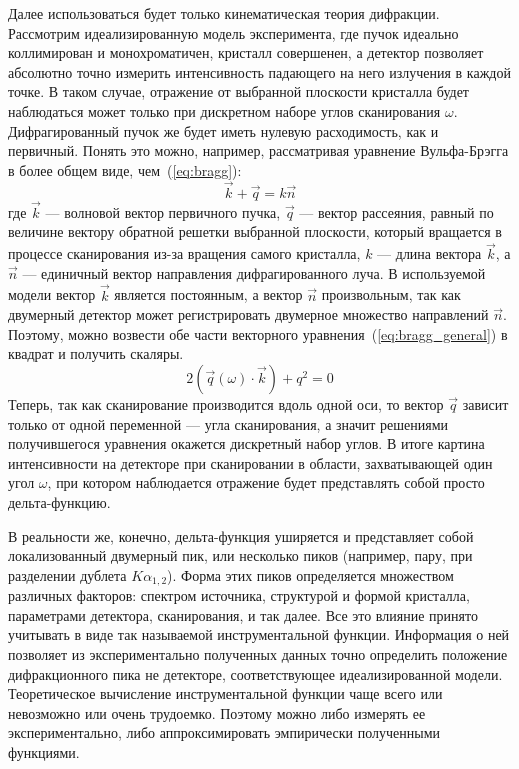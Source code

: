 Далее использоваться будет только кинематическая теория дифракции.
Рассмотрим идеализированную модель эксперимента, где пучок идеально коллимирован и монохроматичен, кристалл совершенен, а детектор позволяет абсолютно точно измерить интенсивность падающего на него излучения в каждой точке.
В таком случае, отражение от выбранной плоскости кристалла будет наблюдаться может только при дискретном наборе углов сканирования $\omega$.
Дифрагированный пучок же будет иметь нулевую расходимость, как и первичный.
Понять это можно, например, рассматривая уравнение Вульфа-Брэгга в более общем виде, чем~(\ref{eq:bragg}):
\begin{equation} \label{eq:bragg_general}
    \vec{k} + \vec{q} = k \vec{n}
\end{equation}
где $\vec{k}$ --- волновой вектор первичного пучка, $\vec{q}$ --- вектор рассеяния, равный по величине вектору обратной решетки выбранной плоскости, который вращается в процессе сканирования из-за вращения самого кристалла, $k$ --- длина вектора $\vec{k}$, а $\vec{n}$ --- единичный вектор направления дифрагированного луча.
В используемой модели вектор $\vec{k}$ является постоянным, а вектор $\vec{n}$ произвольным, так как двумерный детектор может регистрировать двумерное множество направлений $\vec{n}$.
Поэтому, можно возвести обе части векторного уравнения~(\ref{eq:bragg_general}) в квадрат и получить скаляры.
\begin{equation} \label{eq:squared_bragg}
    2(\vec{q}(\omega) \cdot \vec{k}) + q^2 = 0
\end{equation}
Теперь, так как сканирование производится вдоль одной оси, то вектор $\vec{q}$ зависит только от одной переменной --- угла сканирования, а значит решениями получившегося уравнения окажется дискретный набор углов.
В итоге картина интенсивности на детекторе при сканировании в области, захватывающей один угол $\omega$, при котором наблюдается отражение будет представлять собой просто дельта-функцию.

В реальности же, конечно, дельта-функция уширяется и представляет собой локализованный двумерный пик, или несколько пиков (например, пару, при разделении дублета $K\alpha_{1,2}$).
Форма этих пиков определяется множеством различных факторов: спектром источника, структурой и формой кристалла, параметрами детектора, сканирования, и так далее.
Все это влияние принято учитывать в виде так называемой инструментальной функции.
Информация о ней позволяет из экспериментально полученных данных точно определить положение дифракционного пика не детекторе, соответствующее идеализированной модели.
Теоретическое вычисление инструментальной функции чаще всего или невозможно или очень трудоемко.
Поэтому можно либо измерять ее экспериментально, либо аппроксимировать эмпирически полученными функциями.

